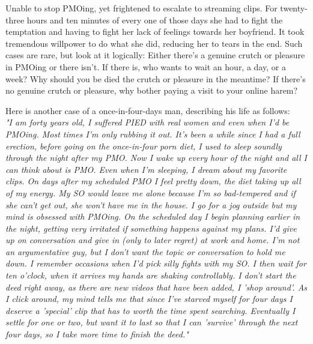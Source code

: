 \documentclass[easypeasy]{subfiles}
\begin{document}
Unable to stop PMOing, yet frightened to escalate to streaming clips. For twenty-three hours and ten minutes of every one of those days she had to fight the temptation and having to fight her lack of feelings towards her boyfriend. It took tremendous willpower to do what she did, reducing her to tears in the end. Such cases are rare, but look at it logically: Either there's a genuine crutch or pleasure in PMOing or there isn't. If there is, who wants to wait an hour, a day, or a week? Why should you be died the crutch or pleasure in the meantime? If there's no genuine crutch or pleasure, why bother paying a visit to your online harem?

  Here is another case of a once-in-four-days man, describing his life as follows:\\

  \textit{"I am forty years old, I suffered PIED with real women and even when I'd be PMOing. Most times I'm only rubbing it out. It's been a while since I had a full erection, before going on the once-in-four porn diet, I used to sleep soundly through the night after my PMO. Now I wake up every hour of the night and all I can think about is PMO. Even when I'm sleeping, I dream about my favorite clips. On days after my scheduled PMO I feel pretty down, the diet taking up all of my energy. My SO would leave me alone because I'm so bad-tempered and if she can't get out, she won't have me in the house. I go for a jog outside but my mind is obsessed with PMOing. On the scheduled day I begin planning earlier in the night, getting very irritated if something happens against my plans. I'd give up on conversation and give in (only to later regret) at work and home. I'm not an argumentative guy, but I don't want the topic or conversation to hold me down. I remember occasions when I'd pick silly fights with my SO. I then wait for ten o'clock, when it arrives my hands are shaking controllably. I don't start the deed right away, as there are new videos that have been added, I 'shop around'. As I click around, my mind tells me that since I've starved myself for four days I deserve a 'special' clip that has to worth the time spent searching. Eventually I settle for one or two, but want it to last so that I can 'survive' through the next four days, so I take more time to finish the deed."}\\
\end{document}

